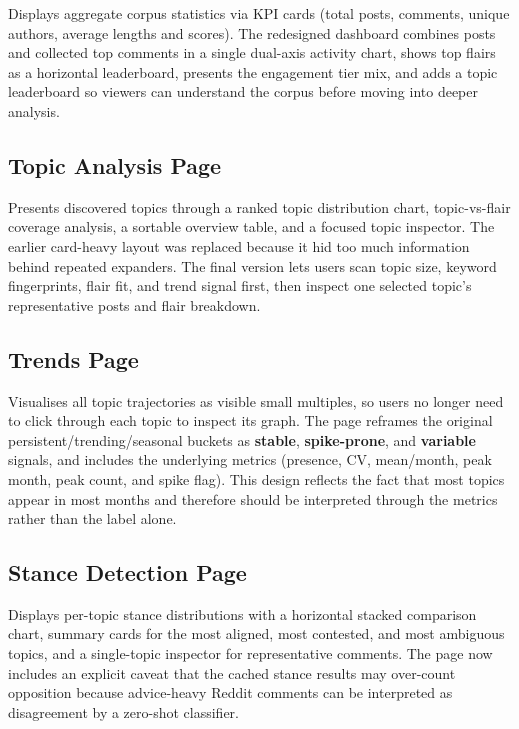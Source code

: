 \documentclass[11pt,a4paper]{article}
\begin{document}
Displays aggregate corpus statistics via KPI cards (total posts, comments, unique authors, average lengths and scores). The redesigned dashboard combines posts and collected top comments in a single dual-axis activity chart, shows top flairs as a horizontal leaderboard, presents the engagement tier mix, and adds a topic leaderboard so viewers can understand the corpus before moving into deeper analysis.

\subsection{Topic Analysis Page}

Presents discovered topics through a ranked topic distribution chart, topic-vs-flair coverage analysis, a sortable overview table, and a focused topic inspector. The earlier card-heavy layout was replaced because it hid too much information behind repeated expanders. The final version lets users scan topic size, keyword fingerprints, flair fit, and trend signal first, then inspect one selected topic's representative posts and flair breakdown.

\subsection{Trends Page}

Visualises all topic trajectories as visible small multiples, so users no longer need to click through each topic to inspect its graph. The page reframes the original persistent/trending/seasonal buckets as \textbf{stable}, \textbf{spike-prone}, and \textbf{variable} signals, and includes the underlying metrics (presence, CV, mean/month, peak month, peak count, and spike flag). This design reflects the fact that most topics appear in most months and therefore should be interpreted through the metrics rather than the label alone.

\subsection{Stance Detection Page}

Displays per-topic stance distributions with a horizontal stacked comparison chart, summary cards for the most aligned, most contested, and most ambiguous topics, and a single-topic inspector for representative comments. The page now includes an explicit caveat that the cached stance results may over-count opposition because advice-heavy Reddit comments can be interpreted as disagreement by a zero-shot classifier.
\end{document}
